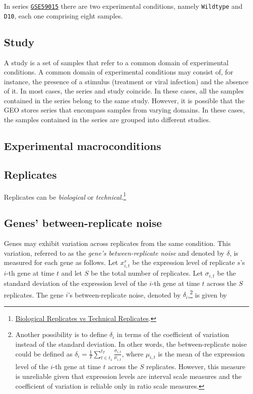 \documentclass[final,letterpaper,12pt]{article}
\begin{document}
\par In series \href{https://www.ncbi.nlm.nih.gov/geo/query/acc.cgi?acc=GSE59015}{\texttt{GSE59015}} there are two experimental conditions, namely \texttt{Wildtype} and \texttt{D10}, each one comprising eight samples.

\subsection{Study}

\par A study is a set of samples that refer to a common domain of experimental conditions. A common domain of experimental conditions may consist of, for instance, the presence of a stimulus (treatment or viral infection) and the absence of it. In most cases, the series and study coincide. In these cases, all the samples contained in the series belong to the same study. However, it is possible that the GEO stores series that encompass samples from varying domains. In these cases, the samples contained in the series are grouped into different studies.


\subsection{Experimental macroconditions}

\subsection{Replicates}
\label{subsection:replicates_1}
\par Replicates can be \emph{biological} or \emph{technical}.\footnote{\href{https://honglangwang.wordpress.com/2012/04/24/【bio-glossary】biological-replicates-vs-technical-replicates/}{Biological Replicates vs Technical Replicates}.}

\subsection{Genes' between-replicate noise}
\label{subsection:replicates}
\par Genes may exhibit variation across replicates from the same condition. This variation, referred to as the \emph{gene's between-replicate noise} and denoted by $\delta$, is measured for each gene as follows. Let $x^s_{i,t}$ be the expression level of replicate $s$'s $i$-th gene at time $t$ and let $S$ be the total number of replicates. Let $\sigma_{i,t}$ be the standard deviation of the expression level of the $i$-th gene at time $t$ across the $S$ replicates. The gene $i$'s between-replicate noise, denoted by $\delta_i$,\footnote{Another possibility is to define $\delta_i$ in terms of the coefficient of variation instead of the standard deviation. In other words, the between-replicate noise could be defined as $\delta_i = \frac{1}{T} \sum_{t \in t_1}^{t_T} \frac{\sigma_{i,t}}{\mu_{i,t}}$, where $\mu_{i,t}$ is the mean of the expression level of the $i$-th gene at time $t$ across the $S$ replicates. However, this measure is unreliable given that expression levels are interval scale measures and the coefficient of variation is reliable only in ratio scale measures.} is given by
\end{document}
